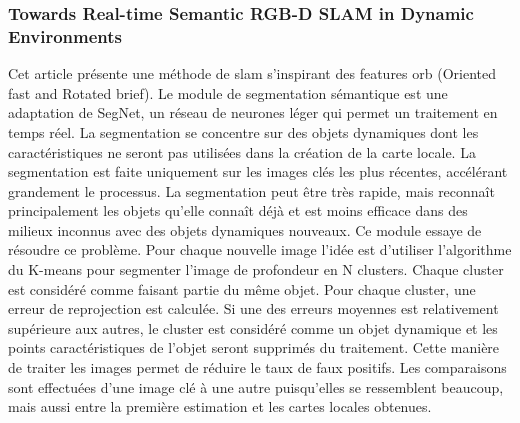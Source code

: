 \documentclass[11pt]{article}
\begin{document}
        \pagebreak  

        \subsubsection{Towards Real-time Semantic RGB-D SLAM in Dynamic Environments} 
          Cet article \cite{jiRealtimeSemanticRGBD2021} présente une méthode de \acrshort{slam} s'inspirant des features \acrshort{orb} (Oriented \acrshort{fast} and Rotated \acrshort{brief}).
          Le module de segmentation sémantique est une adaptation de SegNet, un réseau de neurones léger qui permet un traitement en temps réel.
          La segmentation se concentre sur des objets dynamiques dont les caractéristiques ne seront pas utilisées dans la création de 
          la carte locale. La segmentation est faite uniquement sur les images clés les plus récentes, accélérant grandement le processus.
          La segmentation peut être très rapide, mais reconnaît principalement les objets qu'elle connaît déjà et est moins efficace dans des 
          milieux inconnus avec des objets dynamiques nouveaux. Ce module essaye de résoudre ce problème.
          Pour chaque nouvelle image l'idée est d'utiliser l'algorithme du K-means pour segmenter l'image de profondeur en N clusters.
          Chaque cluster est considéré comme faisant partie du même objet. Pour chaque cluster, une erreur de reprojection est calculée. Si une 
          des erreurs moyennes est relativement supérieure aux autres, le cluster est considéré comme un objet dynamique et les points caractéristiques
          de l'objet seront supprimés du traitement. Cette manière de traiter les images permet de réduire le taux de faux positifs. 
          Les comparaisons sont effectuées d'une image clé à une autre puisqu'elles se ressemblent beaucoup, mais aussi entre la première estimation
          et les cartes locales obtenues.

        \pagebreak
\end{document}
